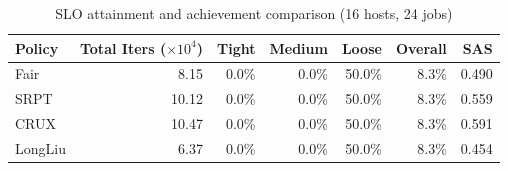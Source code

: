 \begin{table}[t]
\centering
\caption{SLO attainment and achievement comparison (16 hosts, 24 jobs)}
\label{tab:slo_16host}
\begin{tabular}{l|r|r|r|r|r|r}
\hline
Policy & Total Iters ($\times 10^4$) & Tight & Medium & Loose & Overall & SAS \\
\hline
Fair & 8.15 & 0.0\% & 0.0\% & 50.0\% & 8.3\% & 0.490 \\
SRPT & 10.12 & 0.0\% & 0.0\% & 50.0\% & 8.3\% & 0.559 \\
CRUX & 10.47 & 0.0\% & 0.0\% & 50.0\% & 8.3\% & 0.591 \\
LongLiu & 6.37 & 0.0\% & 0.0\% & 50.0\% & 8.3\% & 0.454 \\
\hline
\end{tabular}
\end{table}
